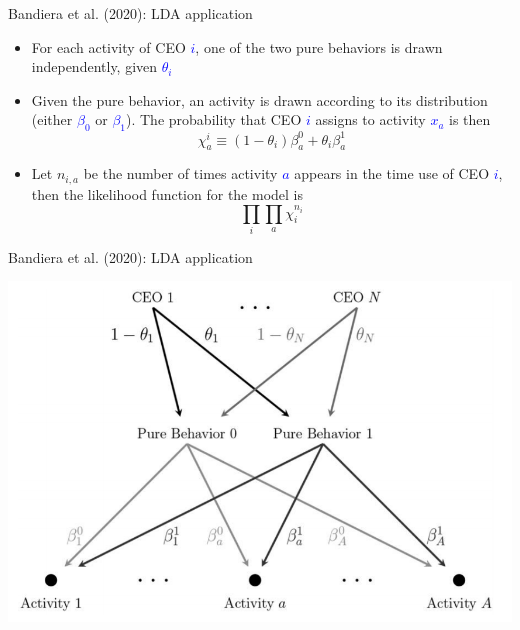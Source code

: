 \documentclass[english]{beamer}
\begin{document}
\begin{frame}{Bandiera et al. (2020): LDA application}
\begin{itemize}
\setlength{\itemsep}{1.5em}
\item For each activity of CEO \textcolor{blue}{$i$}, one of the two pure behaviors is drawn independently, given \textcolor{blue}{$\theta_i$}
\item Given the pure behavior, an activity is drawn according to its distribution (either \textcolor{blue}{$\beta_0$} or \textcolor{blue}{$\beta_1$}). The probability that CEO \textcolor{blue}{$i$} assigns to activity \textcolor{blue}{$x_a$} is then 
$$
\chi_{a}^{i} \equiv\left(1-\theta_{i}\right) \beta_{a}^{0}+\theta_{i} \beta_{a}^{1}
$$
\item Let $n_{i,a}$ be the number of times activity \textcolor{blue}{$a$} appears in the time use of CEO \textcolor{blue}{$i$}, then the likelihood function for the model is $$\prod_{i} \prod_{a} \chi_{i}^{n_{i}}$$
\end{itemize}
\end{frame}%

\begin{frame}{\small{Bandiera et al. (2020): LDA application}}
\vspace{-7pt}
\begin{center}
\includegraphics[scale=0.5]{Images/bandiera2017.png}
\end{center}
\end{frame}
\end{document}
